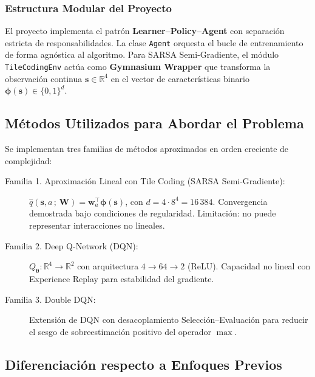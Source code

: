 \subsubsection{Estructura Modular del Proyecto}

El proyecto implementa el patrón \textbf{Learner--Policy--Agent} con separación estricta de responsabilidades. La clase \texttt{Agent} orquesta el bucle de entrenamiento de forma agnóstica al algoritmo. Para SARSA Semi-Gradiente, el módulo \texttt{TileCodingEnv} actúa como \textbf{Gymnasium Wrapper} que transforma la observación continua $\mathbf{s} \in \mathbb{R}^4$ en el vector de características binario $\boldsymbol{\phi}(\mathbf{s}) \in \{0,1\}^d$.

\subsection{Métodos Utilizados para Abordar el Problema}

Se implementan tres familias de métodos aproximados en orden creciente de complejidad:

\begin{description}
  \item[Familia 1. Aproximación Lineal con Tile Coding (SARSA Semi-Gradiente):] $\hat{q}(\mathbf{s}, a\,;\, \mathbf{W}) = \mathbf{w}_a^\top \boldsymbol{\phi}(\mathbf{s})$, con $d = 4 \cdot 8^4 = 16\,384$. Convergencia demostrada bajo condiciones de regularidad. Limitación: no puede representar interacciones no lineales.
  \item[Familia 2. Deep Q-Network (DQN):] $Q_{\boldsymbol{\theta}}: \mathbb{R}^4 \to \mathbb{R}^2$ con arquitectura $4 \to 64 \to 2$ (ReLU). Capacidad no lineal con Experience Replay para estabilidad del gradiente.
  \item[Familia 3. Double DQN:] Extensión de DQN con desacoplamiento Selección--Evaluación para reducir el sesgo de sobreestimación positivo del operador $\max$.
\end{description}

\subsection{Diferenciación respecto a Enfoques Previos}

